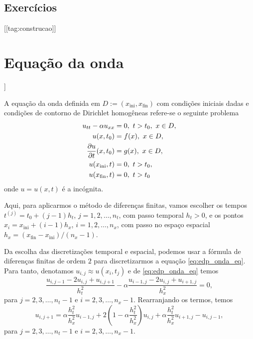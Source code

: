 \subsection{Exercícios}

[[tag:construcao]]

\section{Equação da onda}\label{cap_edp_sec_onda}

\begin{flushleft}
  [[tag:revisar]]
\end{flushleft}

A equação da onda definida em  $D := (x_{\text{ini}}, x_{\text{fin}})$ com condições iniciais dadas e condições de contorno de Dirichlet homogêneas refere-se o seguinte problema
\begin{align}
  u_{tt} - \alpha u_{xx} &= 0,~t>t_0,~x\in D, \label{eq:edp_onda_eq}\\
  u(x,t_0) &= f(x),~x\in D,\label{eq:edp_onda_ci1}\\
  \frac{\partial u}{\partial t}(x,t_0) &= g(x),~x\in D,\label{eq:edp_onda_ci2}\\
  u(x_{\text{ini}},t) &= 0,~t>t_0,\label{eq:edp_onda_bcxini}\\
  u(x_{\text{fin}},t) &= 0,~t>t_0\label{eq:edp_onda_bcxfin}
\end{align}
onde $u = u(x,t)$ é a incógnita.

Aqui, para aplicarmos o método de diferenças finitas, vamos escolher os tempos $t^{(j)} = t_0 + (j-1)h_t$, $j=1, 2, \dotsc, n_t$, com passo temporal $h_t>0$, e os pontos $x_i=x_{\text{ini}}+(i-1)h_x$, $i=1, 2, \dotsc, n_x$, com passo no espaço espacial $h_x = (x_{\text{fin}}-x_{\text{ini}})/(n_x-1)$.

Da escolha das discretizações temporal e espacial, podemos usar a fórmula de diferenças finitas de ordem $2$ para discretizarmos a equação \eqref{eq:edp_onda_eq}. Para tanto, denotamos $u_{i,j} \approx u(x_i,t_j)$ e de \eqref{eq:edp_onda_eq} temos
\begin{equation}
  \frac{u_{i,j-1}-2u_{i,j}+u_{i,j+1}}{h_t^2} - \alpha\frac{u_{i-1,j}-2u_{i,j}+u_{i+1,j}}{h_x^2} = 0,
\end{equation}
para $j=2, 3, \dotsc, n_t-1$ e $i=2, 3, \dotsc, n_x-1$. Rearranjando os termos, temos
\begin{equation}\label{eq:edp_onda_aux1}
  u_{i,j+1} = \alpha\frac{h_t^2}{h_x^2}u_{i-1,j} + 2\left(1-\alpha\frac{h_t^2}{h_x^2}\right)u_{i,j} + \alpha\frac{h_t^2}{h_x^2}u_{i+1,j} - u_{i,j-1},
\end{equation}
para $j=2, 3, \dotsc, n_t-1$ e $i=2, 3, \dotsc, n_x-1$.

